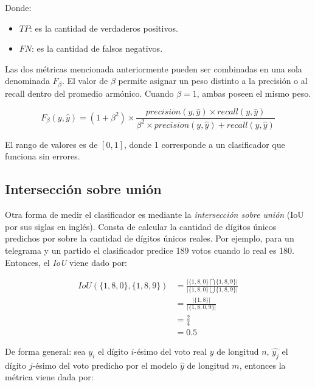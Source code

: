 Donde:
\begin{itemize}
    \item $TP$: es la cantidad de verdaderos positivos.
    \item $FN$: es la cantidad de falsos negativos.
\end{itemize}

Las dos m\'etricas mencionada anteriormente pueden ser combinadas en una sola denominada $F_{\beta}$. El valor de
$\beta$ permite asignar un peso distinto a la precisi\'on o al recall dentro del promedio arm\'onico. Cuando $\beta=1$,
ambas poseen el mismo peso.

\begin{equation}
    F_{\beta}(y, \hat{y}) = (1 + \beta^2) \times \frac{precision(y, \hat{y}) \times recall(y, \hat{y})}{\beta^2 \times precision(y, \hat{y}) + recall(y, \hat{y})}
\end{equation}

El rango de valores es de $[0, 1]$, donde 1 corresponde a un clasificador que funciona sin errores.

\subsection{Intersecci\'on sobre uni\'on}

Otra forma de medir el clasificador es mediante la {\it intersecci\'on sobre uni\'on} (IoU por sus siglas en ingl\'es).
Consta de calcular la cantidad de d\'igitos \'unicos predichos por sobre la cantidad de d\'igitos \'unicos reales. Por
ejemplo, para un telegrama y un partido el clasificador predice 189 votos cuando lo real es 180. Entonces, el {\it IoU}
viene dado por:

\begin{align}
    IoU(\{1, 8, 0\}, \{1, 8, 9\}) & = \frac{\lvert\{1, 8, 0\} \bigcap \{1, 8, 9\}\rvert}{\lvert\{1, 8, 0\} \bigcup \{1, 8, 9\}\rvert} \nonumber \\
                                  & = \frac{\lvert\{1, 8\}\rvert}{\lvert\{1, 8, 0, 9\}\rvert}                                         \nonumber \\
                                  & = \frac{2}{4}                                                                     \nonumber                 \\
                                  & = 0.5
\end{align}

De forma general: sea $y_{i}$ el d\'igito $i$-\'esimo del voto real $y$ de longitud $n$, $\hat{y_{j}}$ el d\'igito
$j$-\'esimo del voto predicho por el modelo $\hat{y}$ de longitud $m$, entonces la m\'etrica viene dada por:

